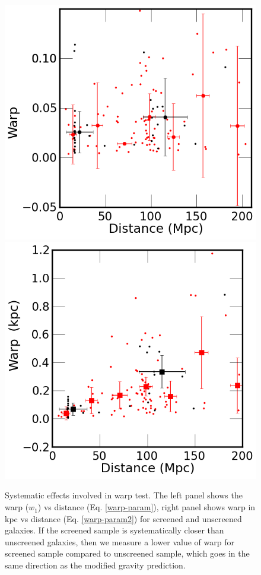 \documentclass[useAMS,usenatbib,twocolumn]{mn2e}
\begin{document}
\begin{figure}
\begin{center}
  \includegraphics[scale=0.37]{figures/distance-vs-warpness.png}
  \includegraphics[scale=0.37]{figures/distance-vs-warp-kpc.png}
  \caption{Systematic effects involved in warp test. The left panel shows the
warp ($w_1$) vs distance (Eq. \ref{warp-param}), right panel shows
warp in kpc vs  distance (Eq. \ref{warp-param2}) for screened and
unscreened galaxies. If the screened sample is systematically
closer than unscreened galaxies, then we measure a lower value of warp for
screened sample compared to unscreened sample, which goes in the same direction
as the modified gravity prediction.}
\label{warp-syst}
\end{center}
\end{figure}
\end{document}
